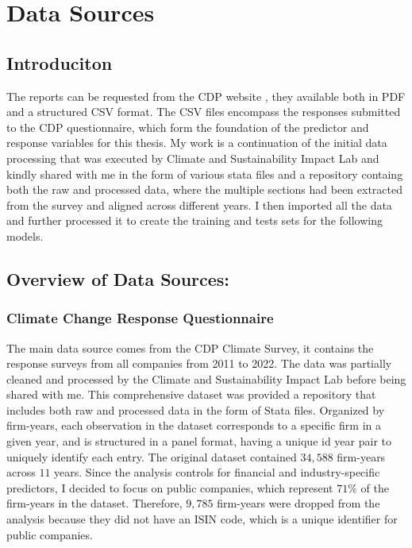 \chapter{Data Sources}
\label{ch:data-sources}

\section{Introduciton}

\noindent The reports can be requested from the CDP website \cite{CDPMain2024}, they available both in PDF and a structured CSV format. The CSV files encompass the responses submitted to the CDP questionnaire, which form the foundation of the predictor and response variables for this thesis. My work is a continuation of the initial data processing that was executed by Climate and Sustainability Impact Lab \cite{HarvardD3Lab2024} and kindly shared with me in the form of various stata files and a repository containg both the raw and processed data, where the multiple sections had been extracted from the survey and aligned across different years. I then imported all the data and further processed it to create the training and tests sets for the following models. 


\section{Overview of Data Sources:}

\subsection{Climate Change Response Questionnaire}
The main data source comes from the CDP Climate Survey, it contains the response surveys from all companies from 2011 to 2022. The data was partially cleaned and processed by the Climate and Sustainability Impact Lab \cite{HarvardD3Lab2024} before being shared with me. This comprehensive dataset was provided a repository that includes both raw and processed data in the form of Stata files. Organized by firm-years, each observation in the dataset corresponds to a specific firm in a given year, and is structured in a panel format, having a unique id year pair to uniquely identify each entry. The original dataset contained $34,588$ firm-years across $11$ years. Since the analysis controls for financial and industry-specific predictors, I decided to focus on public companies, which represent $71\%$ of the firm-years in the dataset. Therefore, $9,785$ firm-years were dropped from the analysis because they did not have an ISIN code, which is a unique identifier for public companies. 

